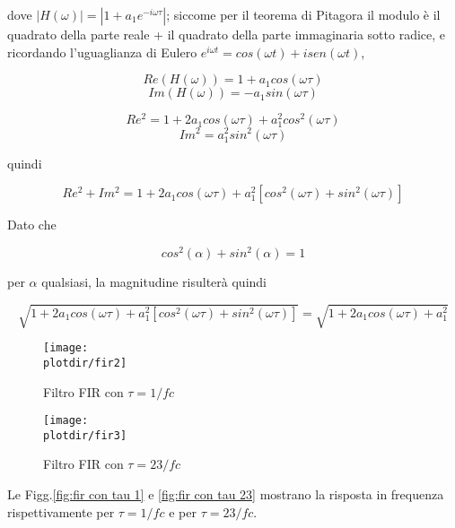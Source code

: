    dove $|H(\omega)| = |1 + a_1 e^{-i\omega \tau}|$; siccome per il teorema di Pitagora il
   modulo \`e il quadrato della parte reale + il quadrato della parte
   immaginaria sotto radice,
   e ricordando l'uguaglianza di Eulero $e^{i \omega t} = cos(\omega t) + i sen(\omega t)$,

     \begin{equation}
    Re(H(\omega)) = 1 + a_1 cos(\omega \tau)
     \end{equation}
     \begin{equation}
    Im(H(\omega)) = - a_1 sin(\omega \tau)
     \end{equation}

     \begin{equation}
    Re^2 = 1 + 2 a_1 cos(\omega \tau) + a_1^2 cos^2(\omega \tau)
     \end{equation}
     \begin{equation}
    Im^2 = a_1^2 sin^2(\omega \tau)
     \end{equation}

    quindi
    
     \begin{equation}
    Re^2 + Im^2 = 1 + 2 a_1 cos(\omega \tau) + a_1^2 [ cos^2(\omega \tau) + sin^2(\omega \tau) ]
     \end{equation}

     Dato che

     \begin{equation}
        cos^2(\alpha) + sin^2(\alpha) = 1
     \end{equation}

     per $\alpha$ qualsiasi, la magnitudine risulter\`a quindi

     \begin{equation}
       \sqrt{1 + 2 a_1 cos(\omega \tau) + a_1^2 [ cos^2(\omega \tau) + sin^2(\omega \tau) ]} = \sqrt{1 + 2 a_1 cos(\omega \tau) + a_1^2}
     \end{equation}
     \begin{figure}[htb]
       \begin{center}
          \texttt{[image: \\plotdir/fir2]}
          \caption{Filtro FIR con $\tau = 1/fc$\label{fig:fir con tau 1}}
       \end{center}
     \end{figure}
     \begin{figure}[htb]
       \begin{center}
          \texttt{[image: \\plotdir/fir3]}
          \caption{Filtro FIR con $\tau = 23/fc$\label{fig:fir con tau 23}}
       \end{center}
     \end{figure}
     Le Figg.\vref{fig:fir con tau 1} e \vref{fig:fir con tau 23} mostrano la
     risposta in frequenza rispettivamente per $\tau = 1/fc$ e per $\tau = 23/fc$.


